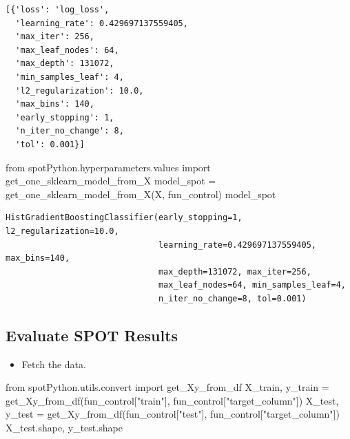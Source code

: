 \documentclass[
  letterpaper,
  DIV=11,
  numbers=noendperiod]{scrreprt}
\newenvironment{Shaded}{\begin{snugshade}}{\end{snugshade}}
\newcommand{\ImportTok}[1]{\textcolor[rgb]{0.00,0.46,0.62}{#1}}
\newcommand{\NormalTok}[1]{\textcolor[rgb]{0.00,0.23,0.31}{#1}}
\newcommand{\OperatorTok}[1]{\textcolor[rgb]{0.37,0.37,0.37}{#1}}
\newcommand{\StringTok}[1]{\textcolor[rgb]{0.13,0.47,0.30}{#1}}
\providecommand{\tightlist}{%
  \setlength{\itemsep}{0pt}\setlength{\parskip}{0pt}}\usepackage{longtable,booktabs,array}
\begin{document}
\begin{verbatim}
[{'loss': 'log_loss',
  'learning_rate': 0.429697137559405,
  'max_iter': 256,
  'max_leaf_nodes': 64,
  'max_depth': 131072,
  'min_samples_leaf': 4,
  'l2_regularization': 10.0,
  'max_bins': 140,
  'early_stopping': 1,
  'n_iter_no_change': 8,
  'tol': 0.001}]
\end{verbatim}

\begin{Shaded}
\begin{Highlighting}[]
\ImportTok{from}\NormalTok{ spotPython.hyperparameters.values }\ImportTok{import}\NormalTok{ get\_one\_sklearn\_model\_from\_X}
\NormalTok{model\_spot }\OperatorTok{=}\NormalTok{ get\_one\_sklearn\_model\_from\_X(X, fun\_control)}
\NormalTok{model\_spot}
\end{Highlighting}
\end{Shaded}

\begin{verbatim}
HistGradientBoostingClassifier(early_stopping=1, l2_regularization=10.0,
                               learning_rate=0.429697137559405, max_bins=140,
                               max_depth=131072, max_iter=256,
                               max_leaf_nodes=64, min_samples_leaf=4,
                               n_iter_no_change=8, tol=0.001)
\end{verbatim}

\hypertarget{evaluate-spot-results-1}{%
\subsection{Evaluate SPOT Results}\label{evaluate-spot-results-1}}

\begin{itemize}
\tightlist
\item
  Fetch the data.
\end{itemize}

\begin{Shaded}
\begin{Highlighting}[]
\ImportTok{from}\NormalTok{ spotPython.utils.convert }\ImportTok{import}\NormalTok{ get\_Xy\_from\_df}
\NormalTok{X\_train, y\_train }\OperatorTok{=}\NormalTok{ get\_Xy\_from\_df(fun\_control[}\StringTok{"train"}\NormalTok{], fun\_control[}\StringTok{"target\_column"}\NormalTok{])}
\NormalTok{X\_test, y\_test }\OperatorTok{=}\NormalTok{ get\_Xy\_from\_df(fun\_control[}\StringTok{"test"}\NormalTok{], fun\_control[}\StringTok{"target\_column"}\NormalTok{])}
\NormalTok{X\_test.shape, y\_test.shape}
\end{Highlighting}
\end{Shaded}
\end{document}
